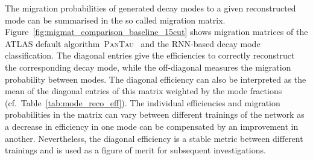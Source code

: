 The migration probabilities of generated decay modes to a given reconstructed
mode can be summarised in the so called migration matrix.
Figure~\ref{fig:migmat_comparison_baseline_15cut} shows migration matrices of
the ATLAS default algorithm~\textsc{PanTau}~\cite{climbach,
  atlas:taurec:decaymodes} and the RNN-based decay mode classification. The
diagonal entries give the efficiencies to correctly reconstruct the
corresponding decay mode, while the off-diagonal measures the migration
probability between modes. The diagonal efficiency can also be interpreted as
the mean of the diagonal entries of this matrix weighted by the mode fractions
(cf.\ Table~\ref{tab:mode_reco_eff}). The individual efficiencies and migration
probabilities in the matrix can vary between different trainings of the network
as a decrease in efficiency in one mode can be compensated by an improvement in
another. Nevertheless, the diagonal efficiency is a stable metric between
different trainings and is used as a figure of merit for subsequent
investigations.

